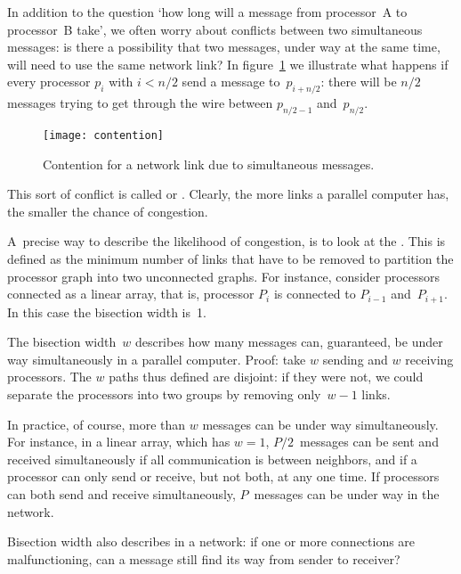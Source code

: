 In addition to the question `how long will a message from processor~A
to processor~B take', we often worry about conflicts between two
simultaneous messages: is there a possibility that two messages, under
way at the same time, will need to use the same network link? In
figure~\ref{fig:contention} we illustrate what happens if every
processor $p_i$ with $i<n/2$ send a message to~$p_{i+n/2}$: there will
be $n/2$ messages trying to get through the wire between $p_{n/2-1}$
and~$p_{n/2}$.
\begin{figure}[ht]
  \texttt{[image: contention]}
  \caption{Contention for a network link due to simultaneous messages.}
  \label{fig:contention}
\end{figure}
This
sort of conflict is called  or
. Clearly, the more links a
parallel computer has, the smaller the chance of congestion.


A~precise way to describe the likelihood of congestion, is
to look at the . This is defined as the
minimum number of links that have to be removed to partition the
processor graph into two unconnected graphs. For instance, consider
processors connected as a linear array, that is, processor $P_i$ is
connected to $P_{i-1}$ and~$P_{i+1}$. In this case the bisection width
is~1.

The bisection width~$w$ describes how many messages can, guaranteed,
be under way simultaneously in a parallel computer. Proof: take $w$
sending and $w$ receiving processors. The $w$ paths thus defined are
disjoint: if they were not, we could separate the processors into two
groups by removing only~$w-1$ links. 

In practice, of course, more than
$w$ messages can be under way simultaneously. For instance, in a
linear array, which has $w=1$, $P/2$~messages can be sent and received
simultaneously if all communication is between neighbors, and if a
processor can only send or receive, but not both, at any one time. If
processors can both send and receive simultaneously, $P$~messages can
be under way in the network.

Bisection width also describes  in a network: if
one or more connections are malfunctioning, can a message
still find its way from sender to receiver?

